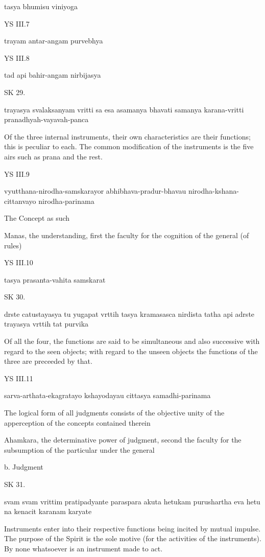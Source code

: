     tasya bhumisu viniyoga

YS III.7

    trayam antar-angam purvebhya

YS III.8

    tad api bahir-angam nirbijasya

SK 29.

trayasya svalaksanyam vritti sa esa asamanya bhavati
samanya karana-vritti pranadhyah-vayavah-panca

Of the three internal instruments, their own characteristics are their functions;
this is peculiar to each.
The common modification of the instruments is the five airs
such as prana and the rest.

YS III.9

    vyutthana-nirodha-samskarayor abhibhava-pradur-bhavau nirodha-kshana-cittanvayo nirodha-parinama

    The Concept as such

    Manas, the understanding, first the faculty for the cognition of the general (of rules)

YS III.10

    tasya prasanta-vahita samskarat

SK 30.

drste catustayasya tu yugapat vrttih tasya kramasasca nirdista
tatha api adrste trayasya vrttih tat purvika

Of all the four, the functions are said to be simultaneous and also successive
with regard to the seen objects;
with regard to the unseen objects
the functions of the three are preceeded by that.

YS III.11

    sarva-arthata-ekagratayo kshayodayau cittasya samadhi-parinama

    The logical form of all judgments consists of the objective unity of
    the apperception of the concepts contained therein

    Ahamkara, the determinative power of judgment,
    second the faculty for the subsumption of the particular under the general

    b. Judgment

SK 31.

svam svam vrittim pratipadyante paraspara akuta hetukam
purushartha eva hetu na kenacit karanam karyate

Instruments enter into their respective functions being incited by mutual impulse.
The purpose of the Spirit is the sole motive (for the activities of the instruments).
By none whatsoever is an instrument made to act.

